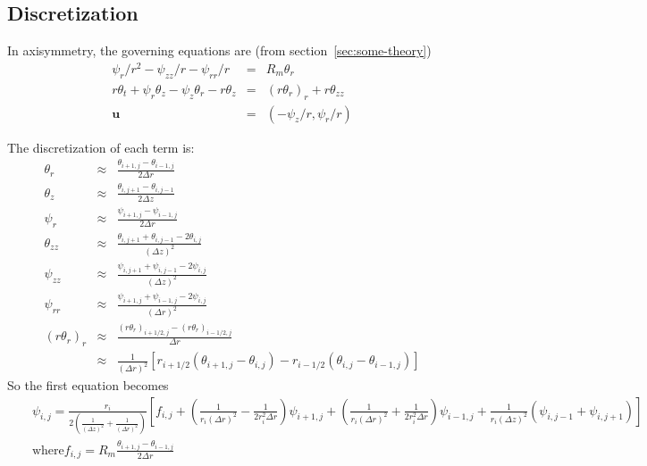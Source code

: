 \documentclass{article}
\begin{document}
\subsection{Discretization}



In axisymmetry, the governing equations are (from section~\ref{sec:some-theory})
\begin{eqnarray}
\psi_r / r^2 - \psi_{zz}/r - \psi_{rr}/r &=& R_m \theta_r \\
r \theta_t + \psi_r \theta_z - \psi_z \theta_r - r \theta_z &=& (r \theta_r)_r + r \theta_{zz} \\
\mathbf{u} &=& \left(-\psi_z / r, \psi_r / r \right)
\end{eqnarray}

The discretization of each term is:
\begin{eqnarray}
\theta_r &\approx& \frac{\theta_{i+1, j} - \theta_{i-1, j}}{2 \Delta r} \\
\theta_z &\approx& \frac{\theta_{i, j+1} - \theta_{i, j-1}}{2 \Delta z} \\
\psi_r &\approx& \frac{\psi_{i+1, j} - \psi_{i-1, j}}{2 \Delta r} \\
\theta_{zz} &\approx& \frac{\theta_{i, j+1} + \theta_{i, j-1} - 2 \theta_{i,j}}{(\Delta z)^2}  \\
\psi_{zz} &\approx& \frac{\psi_{i, j+1} + \psi_{i, j-1} - 2 \psi_{i,j}}{(\Delta z)^2} \\
\psi_{rr} &\approx& \frac{\psi_{i+1, j} + \psi_{i-1, j} - 2 \psi_{i,j}}{(\Delta r)^2} \\
(r \theta_r)_r &\approx& \frac{(r \theta_r)_{i+1/2, j} - (r \theta_r)_{i-1/2,j}}{ \Delta r} \\
&\approx&  \frac{1}{(\Delta r)^2} \left[ r_{i+1/2} \left( \theta_{i+1, j} - \theta_{i, j} \right) - r_{i-1/2} \left( \theta_{i, j} - \theta_{i-1, j} \right)\right]
\end{eqnarray}
So the first equation becomes
\begin{eqnarray}
&&\psi_{i,j} = \frac{r_i}{2 \left( \frac{1}{(\Delta z)^2} + \frac{1}{(\Delta r)^2}\right)} \left[ f_{i,j} + \left(\frac{1}{r_i (\Delta r)^2} - \frac{1}{2 r_i^2 \Delta r} \right) \psi_{i+1, j} +                            \left(\frac{1}{r_i (\Delta r)^2} + \frac{1}{2 r_i^2 \Delta r} \right) \psi_{i-1, j} +               \frac{1}{r_i (\Delta z)^2} \left(\psi_{i,j-1} + \psi_{i, j+1} \right)                         \right] \\
&&\text{where} f_{i,j} = R_m  \frac{\theta_{i+1, j} - \theta_{i-1, j}}{2 \Delta r}
\end{eqnarray}
\end{document}
